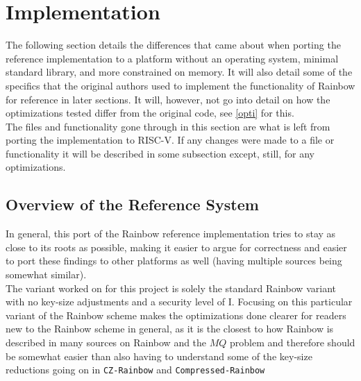 \section{Implementation}
The following section details the differences that came about when porting the reference implementation\cite{rainbowgit} to a platform without an operating system, minimal standard library, and more constrained on memory. It will also detail some of the specifics that the original authors used to implement the functionality of Rainbow for reference in later sections. It will, however, not go into detail on how the optimizations tested differ from the original code, see \cref{opti} for this.\medskip\\
The files and functionality gone through in this section are what is left from porting the implementation to RISC-V. If any changes were made to a file or functionality it will be described in some subsection except, still, for any optimizations.
\subsection{Overview of the Reference System}
In general, this port of the Rainbow reference implementation tries to stay as close to its roots as possible, making it easier to argue for correctness and easier to port these findings to other platforms as well (having multiple sources being somewhat similar).
\medskip\\
The variant worked on for this project is solely the standard Rainbow variant with no key-size adjustments and a security level of I. Focusing on this particular variant of the Rainbow scheme makes the optimizations done clearer for readers new to the Rainbow scheme in general, as it is the closest to how Rainbow is described in many sources on Rainbow and the $MQ$ problem and therefore should be somewhat easier than also having to understand some of the key-size reductions going on in \texttt{CZ-Rainbow} and \texttt{Compressed-Rainbow}
